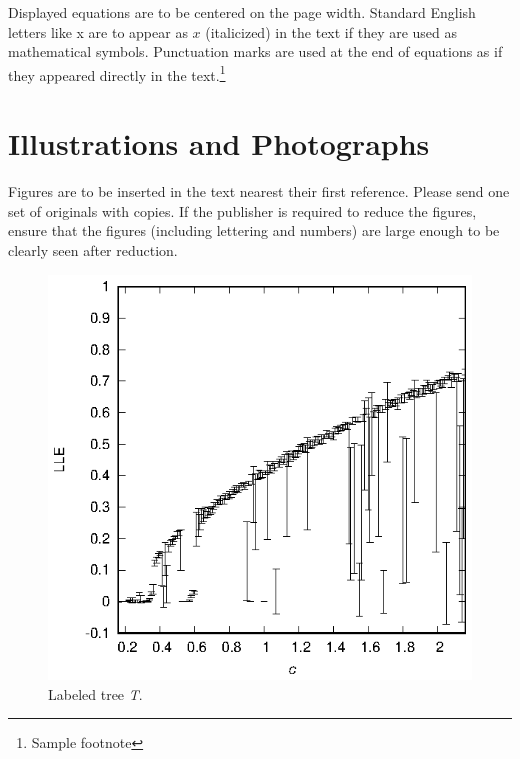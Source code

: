 \documentclass{ws-ijbc}
\begin{document}
Displayed equations are to be centered on the page width. Standard
English letters like x are to appear as $x$ (italicized) in the
text if they are used as mathematical symbols. Punctuation marks
are used at the end of equations as if they appeared directly in
the text.\footnote{Sample footnote}

\section{Illustrations and Photographs}
Figures are to be inserted in the text nearest their
first reference. Please send one set of originals with copies. If the
publisher is required to reduce the figures, ensure that the
figures (including lettering and numbers) are large enough to be
clearly seen after reduction.

\begin{figure}[htbp]
\begin{center}
\includegraphics{lle.eps}
\end{center}
\caption{Labeled tree {\it T}.}
\label{fig2}
\end{figure}
\end{document}
